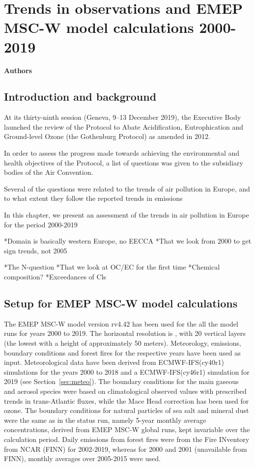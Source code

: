 \chapter[Trends]{Trends in observations and EMEP MSC-W model calculations 2000-2019}
\label{ch:Trends}

{\bf{Authors}}\\


\section{\label{sec:Trends_introduction}Introduction and background}
At its thirty-ninth session (Geneva, 9–13 December 2019), the Executive Body launched the review of the Protocol to Abate Acidification, Eutrophication and Ground-level Ozone (the Gothenburg Protocol) as amended in 2012.

In order to assess  the progress made towards achieving the environmental and health objectives of the Protocol, a
list of questions was given to the subsidiary bodies of the Air Convention.

Several of the questions were related to the trends of air pollution in Europe, and to what extent they follow the reported trends in emissions

In this chapter, we present an assessment of the trends in air pollution in Europe for the period 2000-2019

*Domain is basically western Europe, no EECCA
*That we look from 2000 to get sign trends, not 2005

*The N-question
*That we look at OC/EC for the first time
*Chemical composition?
*Exceedances of Cls

\section{\label{EMEPmodelcalc}{Setup for EMEP MSC-W model calculations}}
The EMEP MSC-W model version rv4.42 has been used for the all the model runs for years 2000 to 2019. The horizontal resolution is \resZO, with 20 vertical layers (the lowest with a height of approximately 50 meters).
 Meteorology, emissions, boundary conditions and forest fires for the respective years have been used as input. Meteorological data have been
 derived from ECMWF-IFS(cy40r1) simulations for the years 2000 to 2018 and a ECMWF-IFS(cy46r1) simulation for 2019 (see Section~\ref{sec:meteo}). 
 The boundary conditions for the main gaseous and aerosol species were based on climatological observed values with prescribed trends in trans-Atlantic fluxes, while the Mace
Head correction has been used for ozone. The boundary conditions for natural particles of
sea salt and mineral dust were the same as in the status run, namely 5-year monthly average
concentrations, derived from EMEP MSC-W global runs, kept invariable over the calculation
period.
Daily emissions from forest fires were from the Fire INventory from NCAR (FINN) for 2002-2019,
whereas for 2000 and 2001 (unavailable from FINN), monthly averages over 2005-2015 were
used.

